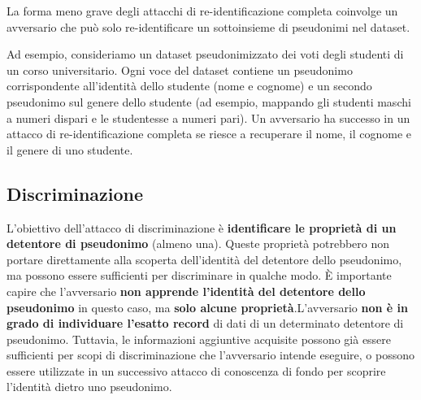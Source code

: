 La forma meno grave degli attacchi di re-identificazione completa coinvolge un avversario che può solo re-identificare un sottoinsieme di pseudonimi nel dataset.

Ad esempio, consideriamo un dataset pseudonimizzato dei voti degli studenti di un corso universitario. Ogni voce del dataset contiene un pseudonimo corrispondente all'identità dello studente (nome e cognome) e un secondo pseudonimo sul genere dello studente (ad esempio, mappando gli studenti maschi a numeri dispari e le studentesse a numeri pari). Un avversario ha successo in un attacco di re-identificazione completa se riesce a recuperare il nome, il cognome e il genere di uno studente.

\subsection{Discriminazione}

L'obiettivo dell'attacco di discriminazione è \textbf{identificare le proprietà di un detentore di pseudonimo} (almeno una). Queste proprietà potrebbero non portare direttamente alla scoperta dell'identità del detentore dello pseudonimo, ma possono essere sufficienti per discriminare in qualche modo.
È importante capire che l'avversario \textbf{non apprende l'identità del detentore dello pseudonimo} in questo caso, ma\textbf{ solo alcune proprietà}.L'avversario \textbf{non è in grado di individuare l'esatto record} di dati di un determinato detentore di pseudonimo. Tuttavia, le informazioni aggiuntive acquisite possono già essere sufficienti per scopi di discriminazione che l'avversario intende eseguire, o possono essere utilizzate in un successivo attacco di conoscenza di fondo per scoprire l'identità dietro uno pseudonimo.

